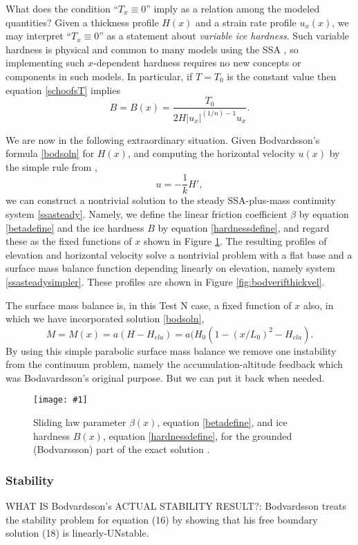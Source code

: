 \documentclass[twocolumn,letterpaper]{igs}
\newcommand{\onecol}[1]{\texttt{[image: \#1]}}
\begin{document}
What does the condition ``$T_x\equiv 0$'' imply as a relation among the modeled quantities?  Given a thickness profile $H(x)$ and a strain rate profile $u_x(x)$, we may interpret ``$T_x\equiv 0$'' as a statement about \emph{variable ice hardness}.  Such variable hardness is physical and common to many models using the SSA \citep{BBssasliding}, so implementing such $x$-dependent hardness requires no new concepts or components in such models.  In particular, if $T=T_0$ is the constant value then equation \eqref{schoofsT} implies
\begin{equation}
B = B(x) = \frac{T_0}{2 H |u_x|^{(1/n)-1} u_x}. \label{hardnessdefine}
\end{equation}

We are now in the following extraordinary situation.  Given Bodvardsson's formula \eqref{bodsoln} for $H(x)$, and computing the horizontal velocity $u(x)$ by the simple rule from \cite{Bodvardsson},
	$$u = -\frac{1}{k} H',$$
we can construct a nontrivial solution to the steady SSA-plus-mass continuity system \eqref{ssasteady}.  Namely, we define the linear friction coefficient $\beta$ by equation \eqref{betadefine} and the ice hardness $B$ by equation \eqref{hardnessdefine}, and regard these as the fixed functions of $x$ shown in Figure \ref{fig:bodverifbetaB}.  The resulting profiles of elevation and horizontal velocity solve a nontrivial problem with a flat base and a surface mass balance function depending linearly on elevation, namely system \eqref{ssasteadysimpler}.  These profiles are shown in Figure \ref{fig:bodverifthickvel}.

The surface mass balance is, in this Test N case, a fixed function of $x$ also, in which we have incorporated solution \eqref{bodsoln},
	$$M = M(x) = a(H-H_{ela}) = a(H_0(1 - (x/L_0)^2 - H_{ela}).$$
By using this simple parabolic surface mass balance we remove one instability from the continuum problem, namely the accumulation-altitude feedback which was Bodavardsson's original purpose.  But we can put it back when needed.

\begin{figure}[ht]
\onecol{bodverifbetaB}
\caption{Sliding law parameter $\beta(x)$, equation \eqref{betadefine}, and ice hardness $B(x)$, equation \eqref{hardnessdefine}, for the grounded (Bodvarssson) part of the exact solution .} \label{fig:bodverifbetaB}
\end{figure}


\subsubsection*{Stability}
WHAT IS Bodvardsson's ACTUAL STABILITY RESULT?:  Bodvardsson treats the stability problem for equation (16) by showing that his free boundary solution (18) is linearly-UNstable.
\end{document}
